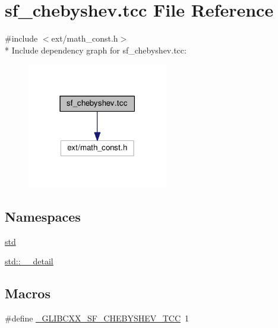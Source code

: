 \hypertarget{sf__chebyshev_8tcc}{}\section{sf\+\_\+chebyshev.\+tcc File Reference}
\label{sf__chebyshev_8tcc}
{\ttfamily \#include $<$ext/math\+\_\+const.\+h$>$}\\*
Include dependency graph for sf\+\_\+chebyshev.\+tcc\+:
\nopagebreak
\begin{figure}[H]
\begin{center}
\leavevmode
\includegraphics[width=174pt]{sf__chebyshev_8tcc__incl}
\end{center}
\end{figure}
\subsection*{Namespaces}
\begin{DoxyCompactItemize}
\item 
 \hyperlink{namespacestd}{std}
\item 
 \hyperlink{namespacestd_1_1____detail}{std\+::\+\_\+\+\_\+detail}
\end{DoxyCompactItemize}
\subsection*{Macros}
\begin{DoxyCompactItemize}
\item 
\#define \hyperlink{sf__chebyshev_8tcc_a4a6b0a9b7599b04e1e7316ab679fa7f5}{\+\_\+\+G\+L\+I\+B\+C\+X\+X\+\_\+\+S\+F\+\_\+\+C\+H\+E\+B\+Y\+S\+H\+E\+V\+\_\+\+T\+C\+C}~1
\end{DoxyCompactItemize}
